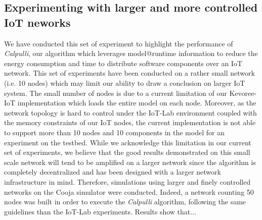 \subsection{Experimenting with larger and more controlled IoT neworks}
\label{sec:cooja}
We have conducted this set of experiment to highlight the performance of \textit{Calpulli}, our algorithm which leverages model@runtime information to reduce the energy consumption and time to distribute software components over an IoT network.
This set of experiments have been conducted on a rather small network (i.e. 10 nodes) which  may limit our ability to draw a conclusion on larger IoT system.
The small number of nodes is due to a current limitation of our Kevoree-IoT implementation which loads the entire model on each node.
Moreover, as the network topology is hard to control under the IoT-Lab environment coupled with the memory constraints of our IoT nodes, the current implementation is not able to support more than 10 nodes and 10 components in the model for an experiment on the testbed. 
While we acknowledge this limitation in our current set of experiments, we believe that the good results demonstrated on this small scale network will tend to be amplified on a larger network since the algorithm is completely decentralized and has been designed with a larger network infrastructure in mind.
Therefore, simulations using larger and finely controlled networks on the Cooja\cite{osterlind2006cross} simulator were conducted.
Indeed, a network counting 50 nodes was built in order to execute the \textit{Calpulli} algorithm, following the same guidelines than the IoT-Lab experiments.
Results show that... 
